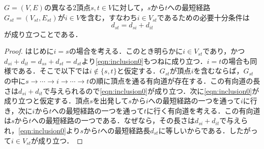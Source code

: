 \begin{lemma}
  $G=(V,E)$の異なる2頂点$s,t \in V$に対して，$s$から$t$への最短経路$G_{st}=(V_{st},E_{st})$が$i \in V$を含む，すなわち$i \in V_{st}$であるための必要十分条件は
  \begin{equation}
    d_{st}=d_{si}+d_{it}
    \label{eqn:inclusion0}
  \end{equation}
  が成り立つことである．
  \label{lemma:1}
\end{lemma}
\begin{proof}
  はじめに$i=s$の場合を考える．このとき明らかに$i \in V_{st}$であり，かつ$d_{si}+d_{it}=d_{ss}+d_{st}=d_{st}$より\eqref{eqn:inclusion0}もつねに成り立つ．$i=t$の場合も同様である．そこで以下では$i \not\in \{s,t\}$と仮定する．$G_{st}$が頂点$i$を含むならば，$G_{st}$の中に$s \rightarrow \cdots \rightarrow i \rightarrow \cdots \rightarrow t$の順に頂点を通る有向道が存在する．この有向道の長さは$d_{si}+d_{it}$で与えられるので\eqref{eqn:inclusion0}が成り立つ．次に\eqref{eqn:inclusion0}が成り立つと仮定する．頂点$s$を出発して$s$から$i$への最短経路の一つを通って$i$に行き，次に$i$から$t$への最短経路の一つを通って$t$に行く有向道を考える．この有向道は$s$から$t$への最短経路の一つである．なぜなら，その長さは$d_{si}+d_{it}$で与えられ，\eqref{eqn:inclusion0}より$s$から$t$への最短経路長$d_{st}$に等しいからである．したがって$i \in V_{st}$が成り立つ．
\end{proof}

